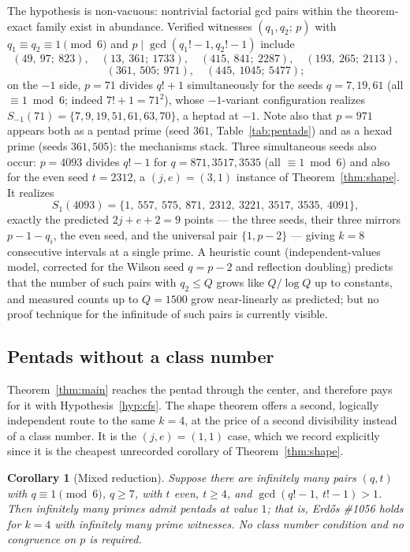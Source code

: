 \documentclass[11pt]{article}
\newtheorem{corollary}[theorem]{Corollary}
\theoremstyle{definition}
\theoremstyle{remark}
\begin{document}
The hypothesis is non-vacuous: nontrivial factorial gcd pairs within the
theorem-exact family exist in abundance. Verified witnesses
$(q_1, q_2;\, p)$ with $q_1 \equiv q_2 \equiv 1 \pmod 6$ and
$p \mid \gcd(q_1!-1, q_2!-1)$ include
\[
  (49,\ 97;\ 823), \quad
  (13,\ 361;\ 1733), \quad
  (415,\ 841;\ 2287), \quad
  (193,\ 265;\ 2113),
\]
\[
  (361,\ 505;\ 971), \quad
  (445,\ 1045;\ 5477);
\]
on the $-1$ side, $p = 71$ divides $q! + 1$ simultaneously for the seeds
$q = 7, 19, 61$ (all $\equiv 1 \bmod 6$; indeed $7! + 1 = 71^2$), whose
$-1$-variant configuration realizes $S_{-1}(71) = \{7, 9, 19, 51, 61, 63,
70\}$, a heptad at $-1$. Note also that $p = 971$ appears both as a pentad
prime (seed $361$, Table~\ref{tab:pentads}) and as a hexad prime (seeds
$361, 505$): the mechanisms stack. Three simultaneous seeds also occur:
$p = 4093$ divides $q! - 1$ for $q = 871, 3517, 3535$ (all
$\equiv 1 \bmod 6$) and also for the even seed $t = 2312$, a
$(j, e) = (3, 1)$ instance of Theorem~\ref{thm:shape}. It realizes
\[
  S_1(4093) = \{1,\ 557,\ 575,\ 871,\ 2312,\ 3221,\ 3517,\ 3535,\ 4091\},
\]
exactly the predicted $2j + e + 2 = 9$ points --- the three seeds, their
three mirrors $p-1-q_i$, the even seed, and the universal pair
$\{1, p-2\}$ --- giving $k = 8$ consecutive intervals at a single prime. A heuristic count (independent-values
model, corrected for the Wilson seed $q = p-2$ and reflection doubling)
predicts that the number of such pairs with $q_2 \le Q$ grows like
$Q/\log Q$ up to constants, and measured counts up to $Q = 1500$ grow
near-linearly as predicted; but no proof technique for the infinitude of
such pairs is currently visible.

\subsection{Pentads without a class number}

Theorem~\ref{thm:main} reaches the pentad through the center, and therefore
pays for it with Hypothesis~\ref{hyp:cfs}. The shape theorem offers a second,
logically independent route to the same $k = 4$, at the price of a second
divisibility instead of a class number. It is the $(j, e) = (1, 1)$ case,
which we record explicitly since it is the cheapest unrecorded corollary of
Theorem~\ref{thm:shape}.

\begin{corollary}[Mixed reduction]\label{cor:mixed}
Suppose there are infinitely many pairs $(q, t)$ with $q \equiv 1 \pmod 6$,
$q \ge 7$, with $t$ even, $t \ge 4$, and
$\gcd(q! - 1,\ t! - 1) > 1$. Then infinitely many primes admit pentads at
value $1$; that is, Erd\H{o}s \#1056 holds for $k = 4$ with infinitely many
prime witnesses. No class number condition and no congruence on $p$ is
required.
\end{corollary}
\end{document}
